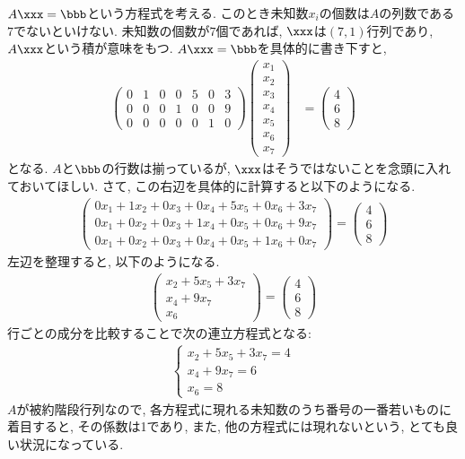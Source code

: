 $A\xxx=\bbb$という方程式を考える.
このとき未知数$x_i$の個数は$A$の列数である$7$でないといけない.
未知数の個数が$7$個であれば, $\xxx$は$(7,1)$行列であり,
$A\xxx$という積が意味をもつ.
$A\xxx=\bbb$を具体的に書き下すと,
\begin{align*}
  \begin{pmatrix}
    0&1&0&0&5&0&3\\
    0&0&0&1&0&0&9\\
    0&0&0&0&0&1&0
  \end{pmatrix}
  \begin{pmatrix}
    x_1\\x_2\\x_3\\x_4\\x_5\\x_6\\x_7
  \end{pmatrix}
  &
  =
  \begin{pmatrix}
    4\\
    6\\
    8
  \end{pmatrix}
\end{align*}
となる.
$A$と$\bbb$の行数は揃っているが,
$\xxx$はそうではないことを念頭に入れておいてほしい.
さて, この右辺を具体的に計算すると以下のようになる.
\begin{align*}
  \begin{pmatrix}
    0x_1+1x_2+0x_3+0x_4+5x_5+0x_6+3x_7\\
    0x_1+0x_2+0x_3+1x_4+0x_5+0x_6+9x_7\\
    0x_1+0x_2+0x_3+0x_4+0x_5+1x_6+0x_7
  \end{pmatrix}
  =
  \begin{pmatrix}
    4\\
    6\\
    8
  \end{pmatrix}
\end{align*}
左辺を整理すると, 以下のようになる.
\begin{align*}
  \begin{pmatrix}
    x_2+5x_5+3x_7\\
    x_4+9x_7\\
    x_6
  \end{pmatrix}
  =
  \begin{pmatrix}
    4\\
    6\\
    8
  \end{pmatrix}
\end{align*}
行ごとの成分を比較することで次の連立方程式となる:
\begin{align*}
  \begin{cases}
    x_2+5x_5+3x_7=4\\
    x_4+9x_7=6\\
    x_6=8
  \end{cases}
\end{align*}
$A$が被約階段行列なので,
各方程式に現れる未知数のうち番号の一番若いものに着目すると,
その係数は1であり,
また, 他の方程式には現れないという, とても良い状況になっている.

